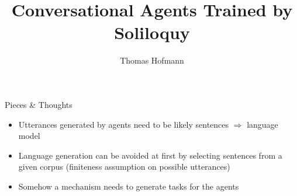 \documentclass{article}
\title{Conversational Agents Trained by Soliloquy}
\author{Thomas Hofmann}
\begin{document}
\maketitle

Pieces \& Thoughts
\begin{itemize}
\item Utterances generated by agents need to be likely sentences $\Longrightarrow$ language model
\item Language generation can be avoided at first by selecting sentences from a given corpus (finiteness assumption on possible utterances)
\item Somehow a mechanism needs to generate tasks for the agents
\end{itemize}
\end{document}
